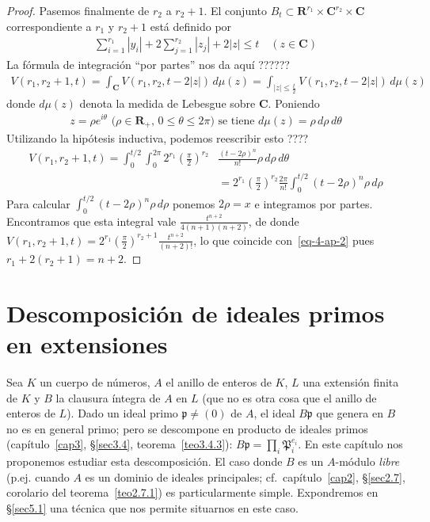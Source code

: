 \documentclass[oneside,bibtotoc,leqno,spanish]{amsbook}
\newcommand{\RR}{\mathbf{R}}
\newcommand{\CC}{\mathbf{C}}
\newcommand{\idl}[1]{\mathfrak{#1}}
\newcommand{\abs}[1]{\left\lvert#1\right\rvert}
\numberwithin{equation}{section}
\theoremstyle{defi}
\theoremstyle{note}
\theoremstyle{rem}
\numberwithin{theorem}{section}
\numberwithin{proposition}{section}
\numberwithin{definition}{section}
\numberwithin{lemma}{section}
\numberwithin{corollary}{section}
\numberwithin{example}{section}
\numberwithin{footnote}{section}%
\begin{document}
\begin{proof}
Pasemos finalmente de $r_{2}$ a $r_{2}+1$. El conjunto $B_{t}\subset\RR^{r_{1}}\times\CC^{r_{2}}\times\CC$
correspondiente a $r_{1}$ y $r_{2}+1$ est\'a definido por
\begin{gather*}
\sum_{i=1}^{r_{1}}\abs{y_{i}}+2\sum_{j=1}^{r_{2}}\abs{z_{j}}+2\abs{z}\leq t\quad(z\in\CC)
\end{gather*}
La f\'ormula de integraci\'on ``por partes'' nos da aqu\'i ??????
\begin{gather*}
V(r_{1},r_{2}+1,t)=\int_{\CC}V(r_{1},r_{2},t-2\abs{z})\,d\mu(z)=\int_{\abs{z}\leq\frac{t}{2}}V(r_{1},r_{2},t-2\abs{z})\,d\mu(z)
\end{gather*}
donde $d\mu(z)$ denota la medida de Lebesgue sobre $\CC$. Poniendo
\begin{gather*}
\text{$z = \rho e^{i\theta}$ ($\rho\in\RR_{+}$, $0\leq\theta\leq 2\pi$) se tiene $d\mu(z) = \rho\,d\rho\,d\theta$}
\end{gather*}
Utilizando la hip\'otesis inductiva, podemos reescribir esto ????
\begin{align*}
V(r_{1},r_{2}+1,t) = \int_{0}^{t/2}\int_{0}^{2\pi}2^{r_{1}}\left(\frac{\pi}{2}\right)^{r_{2}}
&\frac{(t-2\rho)^{n}}{n!}\rho\,d\rho\,d\theta\\
&=2^{r_{1}}\left(\frac{\pi}{2}\right)^{r_{2}}\frac{2\pi}{n!}\int_{0}^{t/2}(t-2\rho)^{n}\rho\,d\rho
\end{align*}
Para calcular $\int_{0}^{t/2}(t-2\rho)^{n}\rho\,d\rho$ ponemos $2\rho = x$ e integramos por partes.
Encontramos que esta integral vale $\frac{t^{n+2}}{4(n+1)(n+2)}$, de donde
$V(r_{1},r_{2}+1,t) = 2^{r_{1}}\left(\frac{\pi}{2}\right)^{r_{2}+1}\frac{t^{n+2}}{(n+2)!}$, lo que coincide
con~\eqref{eq-4-ap-2} pues $r_{1}+2(r_{2}+1)=n+2$.
\end{proof}

\chapter{Descomposici\'on de ideales primos en extensiones}\label{cap5}

Sea $K$ un cuerpo de n\'umeros, $A$ el anillo de enteros de $K$, $L$ una extensi\'on finita de $K$ y $B$
la clausura \'integra de $A$ en $L$ (que no es otra cosa que el anillo de enteros de $L$). Dado un ideal primo
$\idl{p}\neq(0)$ de $A$, el ideal $B\idl{p}$ que genera en $B$ no es en general primo; pero se descompone en
producto de ideales primos (cap\'itulo~\ref{cap3}, \S\ref{sec3.4}, teorema~\ref{teo3.4.3}): $B\idl{p}=\prod_{i}\idl{P}_{i}^{e_{i}}$. En este
cap\'itulo nos proponemos estudiar esta descomposici\'on. El caso donde $B$ es un $A$-m\'odulo {\em libre}
(p.ej. cuando $A$ es un dominio de ideales principales;
cf.~cap\'itulo~\ref{cap2}, \S\ref{sec2.7}, corolario del teorema~\ref{teo2.7.1}) es particularmente
simple. Expondremos en \S\ref{sec5.1} una t\'ecnica que nos permite situarnos en este caso.
\end{document}
